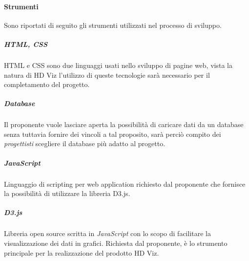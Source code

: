 \paragraph{Strumenti}

Sono riportati di seguito gli strumenti utilizzati nel processo di sviluppo.

\subparagraph{HTML, CSS}

HTML e CSS sono due linguaggi usati nello sviluppo di pagine web, vista la natura di HD Viz l'utilizzo di queste 
tecnologie sarà necessario per il completamento del progetto.

\subparagraph{Database}

Il proponente vuole lasciare aperta la possibilità di caricare dati da un database senza tuttavia fornire dei vincoli 
a tal proposito, sarà perciò compito dei \emph{progettisti} scegliere il database più adatto al progetto.

\subparagraph{JavaScript}

Linguaggio di scripting per web application richiesto dal proponente che fornisce la possibilità di utilizzare la 
libreria D3.js.

\subparagraph{D3.js}

Libreria open source scritta in \emph{JavaScript} con lo scopo di facilitare la visualizzazione dei dati in grafici. 
Richiesta dal proponente, è lo strumento principale per la realizzazione del prodotto HD Viz.